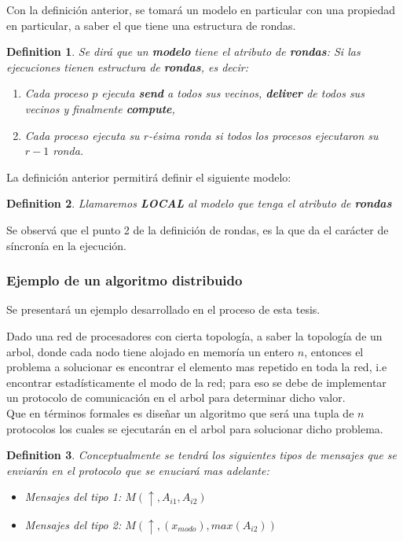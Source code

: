 \documentclass[10pt]{report}
\newtheorem{definition}{Definition}
\begin{document}
    Con la definición anterior, se tomará un modelo en particular con una propiedad en particular, a saber el que
    tiene una estructura de rondas.\newline
    \begin{definition}
        Se dirá que un \textbf{modelo} tiene el atributo de \textbf{rondas}:
        Si las ejecuciones tienen estructura de \textbf{rondas}, es decir:
        \begin{enumerate}
            \item Cada proceso $p$ ejecuta \textbf{send} a todos sus vecinos, \textbf{deliver} de todos sus vecinos y finalmente \textbf{compute},
            \item Cada proceso ejecuta su $r$-ésima ronda si todos los procesos ejecutaron su $r-1$ ronda.
        \end{enumerate}
    \end{definition}\newline
    La definición anterior permitirá definir el siguiente modelo:
    \begin{definition}
        Llamaremos \textbf{LOCAL} al modelo que tenga el atributo de \textbf{rondas}
    \end{definition}
    Se observá que el punto 2 de la definición de rondas, es la que da el carácter de
    síncronía en la ejecución.
    \subsubsection{Ejemplo de un algoritmo distribuido}
    Se presentará un ejemplo desarrollado en el proceso de esta tesis.

    \newline
    Dado una red de procesadores con cierta topología, a saber la topología de un arbol,
donde cada nodo tiene alojado en memoría un entero $n$, entonces el problema a solucionar es encontrar el
elemento mas repetido en toda la red, i.e encontrar estadísticamente el modo de la red;
para eso se debe de implementar un protocolo de comunicación en el arbol para determinar dicho valor.\\
Que en términos formales es diseñar un algoritmo que será una tupla de $n$ protocolos los cuales
se ejecutarán en el arbol para solucionar dicho problema.


\begin{definition}
    Conceptualmente se tendrá los siguientes tipos de mensajes que se enviarán en el protocolo que se enuciará mas adelante:
    \begin{itemize}
        \item Mensajes del tipo 1: $M(\uparrow, A_{i1},A_{i2}) $
        \item Mensajes del tipo 2: $ M(\uparrow,(x_{modo}), max(A_{i2}))$
    \end{itemize}
\end{definition}
\end{document}
